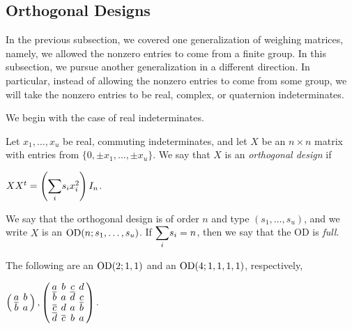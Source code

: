 \documentclass[../../../main]{subfiles}
\begin{document}
 \dinkus


 \subsection{Orthogonal Designs}

 In the previous subsection, we covered one generalization of weighing matrices,
 namely, we allowed the nonzero entries to come from a finite group. In this
 subsection, we pursue another generalization in a different direction. In
 particular, instead of allowing the nonzero entries to come from some group, we
will take the nonzero entries to be real, complex, or
quaternion indeterminates.

We begin with the case of real indeterminates.

\begin{defin}\label{real-od-def}
  Let $x_1, \dots, x_u$ be real, commuting indeterminates, and let $X$ be an $n
  \times n$ matrix with entries from $\{0,\pm x_1, \dots, \pm x_u\}$. We say
  that $X$ is an {\it orthogonal design} if 
  \begin{defenum}
  \item\label{od-def-eq} $XX^t = \left( \ssum_i s_ix_i^2 \right)I_n$.
  \end{defenum}
  We say that the orthogonal design is of order $n$ and type $(s_1, \dots,
  s_u)$, and we write $X$ is an $\text{OD}(n;s_1, \dots, s_u)$. If $\ssum_i s_i=n$,
  then we say that the OD is {\it full}. 
\end{defin}

\begin{ex}
  The following are an $\text{OD}(2;1,1)$ and an $\text{OD}(4;1,1,1,1)$, respectively,
  \begin{defenum}
  \item $
    \left(
      \arraycolsep=2.0pt\def\arraystretch{0.5}
      \begin{array}{cc}
        a & b \\ \bar{b} & a
      \end{array}
    \right),
    \left(
      \arraycolsep=2.0pt\def\arraystretch{0.5}
      \begin{array}{cccc}
        a & b & c & d \\
        \bar{b} & a & \bar{d} & c \\
        \bar{c} & d & a & \bar{b} \\
        \bar{d} & \bar{c} & b & a
      \end{array}
    \right).
    $
  \end{defenum}
\end{ex}
\end{document}
